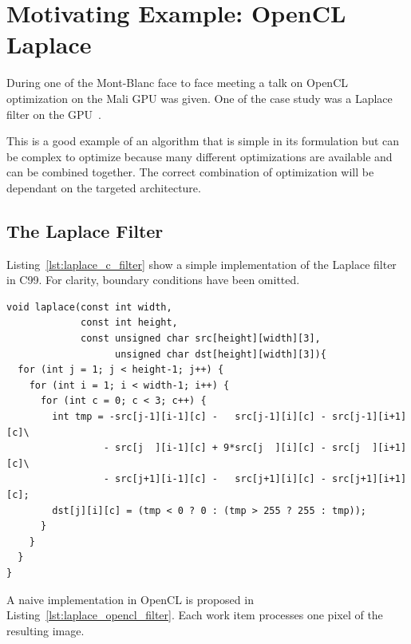 \documentclass[11pt, a4paper, twoside]{montblanc}
\begin{document}
\section{Motivating Example: OpenCL Laplace}
\label{sec:laplace}

During one of the Mont-Blanc face to face meeting a talk on OpenCL optimization
on the Mali GPU was given. One of the case study was a Laplace filter on the
GPU~\cite{opencl_arm_training}.

This is a good example of an algorithm that is simple in its formulation but can
be complex to optimize because many different optimizations are available and
can be combined together. The correct combination of optimization will be
dependant on the targeted architecture.

\subsection{The Laplace Filter}

Listing~\ref{lst:laplace_c_filter} show a simple implementation of the Laplace
filter in C99. For clarity, boundary conditions have been omitted.

\begin{lstlisting}
void laplace(const int width,
             const int height,
             const unsigned char src[height][width][3],
                   unsigned char dst[height][width][3]){
  for (int j = 1; j < height-1; j++) {
    for (int i = 1; i < width-1; i++) {
      for (int c = 0; c < 3; c++) {
        int tmp = -src[j-1][i-1][c] -   src[j-1][i][c] - src[j-1][i+1][c]\
                 - src[j  ][i-1][c] + 9*src[j  ][i][c] - src[j  ][i+1][c]\
                 - src[j+1][i-1][c] -   src[j+1][i][c] - src[j+1][i+1][c];
        dst[j][i][c] = (tmp < 0 ? 0 : (tmp > 255 ? 255 : tmp));
      }
    }
  }
}
\end{lstlisting}

A naive implementation in OpenCL is proposed in
Listing~\ref{lst:laplace_opencl_filter}. Each work item processes one pixel of
the resulting image.
\end{document}
